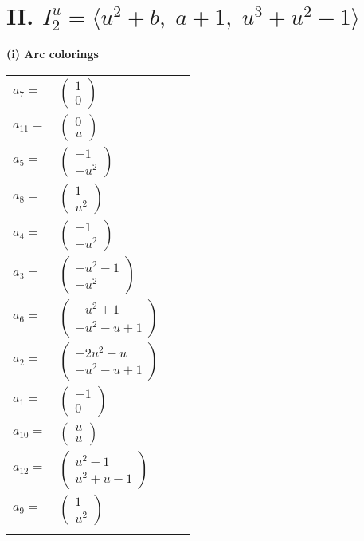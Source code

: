 \documentclass[1p]{elsarticle_modified}
\theoremstyle{definition}
\begin{document}
\centering \section*{II. $I^u_{2}= \langle u^2+b,\;a+1,\;u^3+u^2-1 \rangle$}
\flushleft \textbf{(i) Arc colorings}\\
\begin{tabular}{m{7pt} m{180pt} m{7pt} m{180pt} }
\flushright $a_{7}=$&$\begin{pmatrix}1\\0\end{pmatrix}$ \\
\flushright $a_{11}=$&$\begin{pmatrix}0\\u\end{pmatrix}$ \\
\flushright $a_{5}=$&$\begin{pmatrix}-1\\- u^2\end{pmatrix}$ \\
\flushright $a_{8}=$&$\begin{pmatrix}1\\u^2\end{pmatrix}$ \\
\flushright $a_{4}=$&$\begin{pmatrix}-1\\- u^2\end{pmatrix}$ \\
\flushright $a_{3}=$&$\begin{pmatrix}- u^2-1\\- u^2\end{pmatrix}$ \\
\flushright $a_{6}=$&$\begin{pmatrix}- u^2+1\\- u^2- u+1\end{pmatrix}$ \\
\flushright $a_{2}=$&$\begin{pmatrix}-2 u^2- u\\- u^2- u+1\end{pmatrix}$ \\
\flushright $a_{1}=$&$\begin{pmatrix}-1\\0\end{pmatrix}$ \\
\flushright $a_{10}=$&$\begin{pmatrix}u\\u\end{pmatrix}$ \\
\flushright $a_{12}=$&$\begin{pmatrix}u^2-1\\u^2+u-1\end{pmatrix}$ \\
\flushright $a_{9}=$&$\begin{pmatrix}1\\u^2\end{pmatrix}$\\&\end{tabular}
\end{document}
